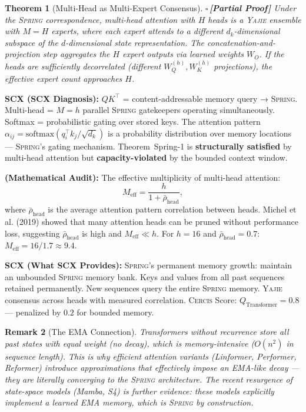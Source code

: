 \documentclass[12pt,a4paper]{article}
\newtheorem{theorem}{Theorem}[section]
\newtheorem{remark}[theorem]{Remark}
\theoremstyle{definition}
\newcommand{\rigorPartial}{{\color{rigorcolor}$\square$\,\textbf{[Partial Proof]}}}
\newcommand{\Yajie}{\textsc{Yajie}}
\newcommand{\Spring}{\textsc{Spring}}
\newcommand{\Cercis}{\textsc{Cercis}}
\newcommand{\whatMissing}{\noindent\textbf{SCX (What SCX Provides):} }
\newcommand{\diagnosis}{\noindent\textbf{SCX (SCX Diagnosis):} }
\newcommand{\mathAudit}{\noindent\textbf{ (Mathematical Audit):} }
\begin{document}
\begin{theorem}[Multi-Head as Multi-Expert Consensus]\label{thm:multihead_yajie}
\rigorPartial
Under the \Spring{} correspondence, multi-head attention with $H$ heads is a \Yajie{} ensemble with $M = H$ experts, where each expert attends to a different $d_k$-dimensional subspace of the $d$-dimensional state representation. The concatenation-and-projection step aggregates the $H$ expert outputs via learned weights $W_O$. If the heads are sufficiently decorrelated (different $W_Q^{(h)}, W_K^{(h)}$ projections), the effective expert count approaches $H$.
\end{theorem}

\diagnosis{} $QK^\top$ = content-addressable memory query → \Spring{}. Multi-head = $M = h$ parallel \Spring{} gatekeepers operating simultaneously. Softmax = probabilistic gating over stored keys. The attention pattern $\alpha_{ij} = \text{softmax}(q_i^\top k_j / \sqrt{d_k})$ is a probability distribution over memory locations — \Spring{}'s gating mechanism. Theorem~Spring-1 is \textbf{structurally satisfied} by multi-head attention but \textbf{capacity-violated} by the bounded context window.

\mathAudit{} The effective multiplicity of multi-head attention:
\[
M_{\text{eff}} = \frac{h}{1 + \bar{\rho}_{\text{head}}},
\]
where $\bar{\rho}_{\text{head}}$ is the average attention pattern correlation between heads. Michel et al. (2019) showed that many attention heads can be pruned without performance loss, suggesting $\bar{\rho}_{\text{head}}$ is high and $M_{\text{eff}} \ll h$. For $h=16$ and $\bar{\rho}_{\text{head}}=0.7$: $M_{\text{eff}} = 16/1.7 \approx 9.4$.

\whatMissing{} \Spring{}'s permanent memory growth: maintain an unbounded \Spring{} memory bank. Keys and values from all past sequences retained permanently. New sequences query the entire \Spring{} memory. \Yajie{} consensus across heads with measured correlation. \Cercis{} Score: $Q_{\text{Transformer}} = 0.8$ — penalized by $0.2$ for bounded memory.

\begin{remark}[The EMA Connection]
Transformers without recurrence store all past states with equal weight (no decay), which is memory-intensive ($O(n^2)$ in sequence length). This is why efficient attention variants (Linformer, Performer, Reformer) introduce approximations that effectively impose an EMA-like decay — they are literally converging to the \Spring{} architecture. The recent resurgence of state-space models (Mamba, S4) is further evidence: these models explicitly implement a learned EMA memory, which is \Spring{} by construction.
\end{remark}
\end{document}
